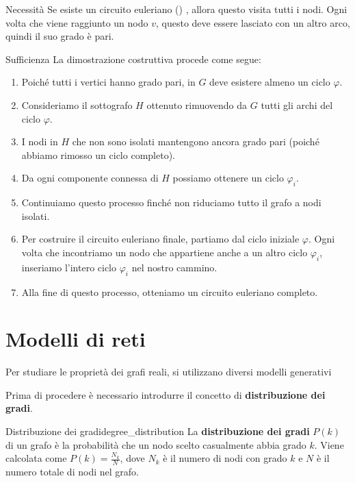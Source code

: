 \begin{teorema}{Necessità}{}
    Se esiste un circuito euleriano () , allora
    questo visita tutti i nodi. Ogni volta che viene raggiunto un nodo $v$,
    questo deve essere lasciato con un altro arco, quindi il suo grado è pari.
\end{teorema}

\begin{dimostrazione}{Sufficienza}{}
    La dimostrazione costruttiva procede come segue:
    \begin{enumerate}
        \item Poiché tutti i vertici hanno grado pari, in $G$ deve esistere
        almeno un ciclo $\varphi$.
        \item Consideriamo il sottografo $H$ ottenuto rimuovendo da $G$ tutti
        gli archi del ciclo $\varphi$.
        \item I nodi in $H$ che non sono isolati mantengono ancora grado pari
        (poiché abbiamo rimosso un ciclo completo).
        \item Da ogni componente connessa di $H$ possiamo ottenere un ciclo
        $\varphi_i$.
        \item Continuiamo questo processo finché non riduciamo tutto il grafo
        a nodi isolati.
        \item Per costruire il circuito euleriano finale, partiamo dal ciclo
        iniziale $\varphi$. Ogni volta che incontriamo un nodo che appartiene
        anche a un altro ciclo $\varphi_i$, inseriamo l'intero ciclo $\varphi_i$
        nel nostro cammino.
        \item Alla fine di questo processo, otteniamo un circuito euleriano
        completo.
    \end{enumerate}
\end{dimostrazione}


\section{Modelli di reti}

Per studiare le proprietà dei grafi reali, si utilizzano diversi modelli
generativi

Prima di procedere è necessario introdurre il concetto di
\textbf{distribuzione dei gradi}.

\begin{definizione}{Distribuzione dei gradi}{degree_distribution}
    La \textbf{distribuzione dei gradi} $P(k)$ di un grafo è la
    probabilità che un nodo scelto casualmente abbia grado $k$.
    Viene calcolata come $P(k) = \frac{N_k}{N}$, dove $N_k$ è il numero di
    nodi con grado $k$ e $N$ è il numero totale di nodi nel grafo.
\end{definizione}

